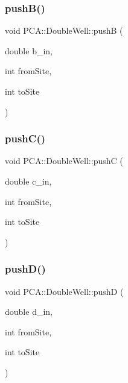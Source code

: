 \hypertarget{class_p_c_a_1_1_double_well_a3c939dcf9f2e440d6c213444e638c37c}{}\label{class_p_c_a_1_1_double_well_a3c939dcf9f2e440d6c213444e638c37c} 
\subsubsection{\texorpdfstring{push\+B()}{pushB()}}
{\footnotesize\ttfamily void P\+C\+A\+::\+Double\+Well\+::pushB (\begin{DoxyParamCaption}\item[{double}]{b\+\_\+in,  }\item[{int}]{from\+Site,  }\item[{int}]{to\+Site }\end{DoxyParamCaption})}

\hypertarget{class_p_c_a_1_1_double_well_ab411ce77646f2241bb358df3c9fd62a8}{}\label{class_p_c_a_1_1_double_well_ab411ce77646f2241bb358df3c9fd62a8} 
\subsubsection{\texorpdfstring{push\+C()}{pushC()}}
{\footnotesize\ttfamily void P\+C\+A\+::\+Double\+Well\+::pushC (\begin{DoxyParamCaption}\item[{double}]{c\+\_\+in,  }\item[{int}]{from\+Site,  }\item[{int}]{to\+Site }\end{DoxyParamCaption})}

\hypertarget{class_p_c_a_1_1_double_well_a0ac140e12ed2138343cb0619781e42f2}{}\label{class_p_c_a_1_1_double_well_a0ac140e12ed2138343cb0619781e42f2} 
\subsubsection{\texorpdfstring{push\+D()}{pushD()}}
{\footnotesize\ttfamily void P\+C\+A\+::\+Double\+Well\+::pushD (\begin{DoxyParamCaption}\item[{double}]{d\+\_\+in,  }\item[{int}]{from\+Site,  }\item[{int}]{to\+Site }\end{DoxyParamCaption})}

